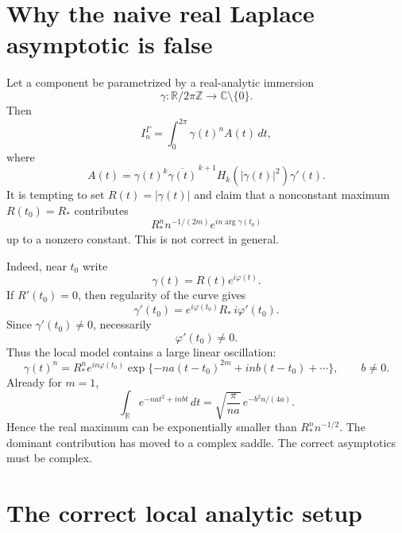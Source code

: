 \documentclass[11pt]{article}
\newcommand{\C}{\mathbb C}
\newcommand{\R}{\mathbb R}
\newcommand{\dd}{\,d}
\newcommand{\1}{\mathbf 1}
\begin{document}
\section{Why the naive real Laplace asymptotic is false}

Let a component be parametrized by a real-analytic immersion
\[
  \gamma:\R/2\pi\mathbb Z\to \C\setminus\{0\}.
\]
Then
\begin{equation}\label{eq:param-integral}
  I_n^\Gamma=\int_0^{2\pi}\gamma(t)^n A(t)\dd t,
\end{equation}
where
\[
  A(t)=\gamma(t)^k\overline{\gamma(t)}^{\,k+1}
       H_k(|\gamma(t)|^2)\gamma'(t).
\]
It is tempting to set \(R(t)=|\gamma(t)|\) and claim that a nonconstant maximum
\(R(t_0)=R_*\) contributes
\[
  R_*^n n^{-1/(2m)}e^{in\arg\gamma(t_0)}
\]
up to a nonzero constant. This is not correct in general.

Indeed, near \(t_0\) write
\[
  \gamma(t)=R(t)e^{i\varphi(t)} .
\]
If \(R'(t_0)=0\), then regularity of the curve gives
\[
  \gamma'(t_0)=e^{i\varphi(t_0)}R_*\,i\varphi'(t_0).
\]
Since \(\gamma'(t_0)\ne0\), necessarily
\[
  \varphi'(t_0)\ne0.
\]
Thus the local model contains a large linear oscillation:
\[
  \gamma(t)^n
  =
  R_*^n e^{in\varphi(t_0)}
  \exp\{-na(t-t_0)^{2m}+inb(t-t_0)+\cdots\},
  \qquad b\ne0.
\]
Already for \(m=1\),
\[
  \int_{\R}e^{-na t^2+inbt}\dd t
  =
  \sqrt{\frac{\pi}{na}}\,
  e^{-b^2n/(4a)}.
\]
Hence the real maximum can be exponentially smaller than \(R_*^n n^{-1/2}\). The
dominant contribution has moved to a complex saddle. The correct asymptotics must be
complex.

\section{The correct local analytic setup}
\end{document}
